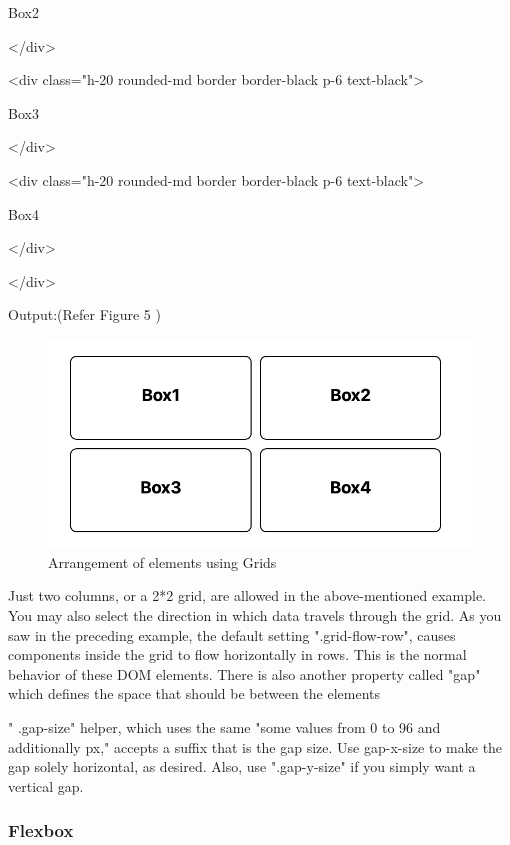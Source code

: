 \documentclass[conference]{IEEEtran}
\begin{document}
Box2

\textless/div\textgreater{}

\textless div class="h-20 rounded-md border border-black p-6
text-black"\textgreater{}

Box3

\textless/div\textgreater{}

\textless div class="h-20 rounded-md border border-black p-6 
text-black"\textgreater{}

Box4

\textless/div\textgreater{}

\textless/div\textgreater{}

Output:(Refer Figure 5 )
\newline


\begin{figure}
    \centering
    \includegraphics[width=1\linewidth]{grid_boxez.png}
    \caption{Arrangement of elements using Grids}
    \label{fig:enter-label}
\end{figure}

Just two columns, or a 2*2 grid, are allowed in the above-mentioned example. You may also select the direction in which data travels through the grid. As you saw in the preceding example, the default setting ".grid-flow-row", causes components inside the grid to flow horizontally in rows. This is the normal behavior of these DOM elements. There is also another property called "gap" which defines the space that should be between the elements

" .gap-size" helper, which uses the same "some values from 0 to 96 and additionally px," accepts a suffix that is the gap size. Use gap-x-size to make the gap solely horizontal, as desired. Also, use ".gap-y-size" if you simply want a vertical gap.

\subsubsection{\textbf{Flexbox}}
\end{document}
